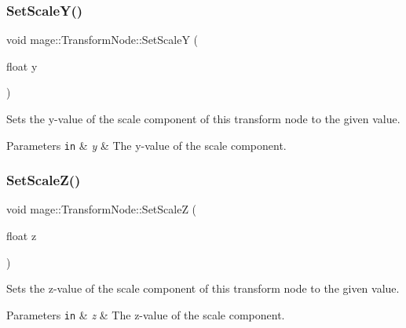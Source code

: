 \subsubsection{\texorpdfstring{Set\+Scale\+Y()}{SetScaleY()}}
{\footnotesize\ttfamily void mage\+::\+Transform\+Node\+::\+Set\+ScaleY (\begin{DoxyParamCaption}\item[{float}]{y }\end{DoxyParamCaption})\hspace{0.3cm}{\ttfamily [noexcept]}}

Sets the y-\/value of the scale component of this transform node to the given value.


\begin{DoxyParams}[1]{Parameters}
\mbox{\tt in}  & {\em y} & The y-\/value of the scale component. \\
\hline
\end{DoxyParams}
\hypertarget{structmage_1_1_transform_node_a2a9445f59648a7b5c2ab7a197617c909}{}\label{structmage_1_1_transform_node_a2a9445f59648a7b5c2ab7a197617c909} 
\subsubsection{\texorpdfstring{Set\+Scale\+Z()}{SetScaleZ()}}
{\footnotesize\ttfamily void mage\+::\+Transform\+Node\+::\+Set\+ScaleZ (\begin{DoxyParamCaption}\item[{float}]{z }\end{DoxyParamCaption})\hspace{0.3cm}{\ttfamily [noexcept]}}

Sets the z-\/value of the scale component of this transform node to the given value.


\begin{DoxyParams}[1]{Parameters}
\mbox{\tt in}  & {\em z} & The z-\/value of the scale component. \\
\hline
\end{DoxyParams}
\hypertarget{structmage_1_1_transform_node_a5cb84130381c984174ccefdcf65a62c6}{}\label{structmage_1_1_transform_node_a5cb84130381c984174ccefdcf65a62c6} 
